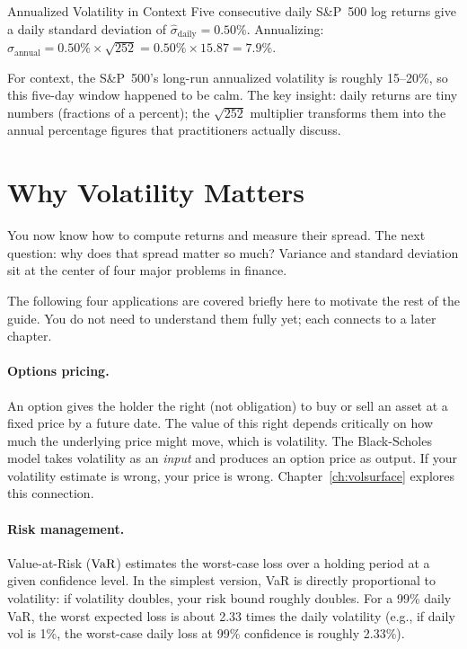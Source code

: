 \begin{workedexample}{Annualized Volatility in Context}
Five consecutive daily S\&P~500 log returns give a daily standard deviation of $\hat{\sigma}_{\text{daily}} = 0.50\%$.
Annualizing: $\hat{\sigma}_{\text{annual}} = 0.50\% \times \sqrt{252} = 0.50\% \times 15.87 = 7.9\%$.

For context, the S\&P~500's long-run annualized volatility is roughly 15--20\%, so this five-day window happened to be calm.
The key insight: daily returns are tiny numbers (fractions of a percent); the $\sqrt{252}$ multiplier transforms them into the annual percentage figures that practitioners actually discuss.
\end{workedexample}

\section{Why Volatility Matters}
\label{sec:why-vol-matters}

You now know how to compute returns and measure their spread.
The next question: why does that spread matter so much?
Variance and standard deviation sit at the center of four major problems in finance.

\begin{prereq}
The following four applications are covered briefly here to motivate the rest of the guide.
You do not need to understand them fully yet; each connects to a later chapter.
\end{prereq}

\paragraph{Options pricing.}
An option gives the holder the right (not obligation) to buy or sell an asset at a fixed price by a future date.
The value of this right depends critically on how much the underlying price might move, which is volatility.
The Black-Scholes model \citep{Black1973} takes volatility as an \emph{input} and produces an option price as output.
If your volatility estimate is wrong, your price is wrong.
Chapter~\ref{ch:volsurface} explores this connection.

\paragraph{Risk management.}
Value-at-Risk ($\operatorname{VaR}$) estimates the worst-case loss over a holding period at a given confidence level.
In the simplest version, VaR is directly proportional to volatility: if volatility doubles, your risk bound roughly doubles.
For a 99\% daily VaR, the worst expected loss is about 2.33 times the daily volatility (e.g., if daily vol is 1\%, the worst-case daily loss at 99\% confidence is roughly 2.33\%).

